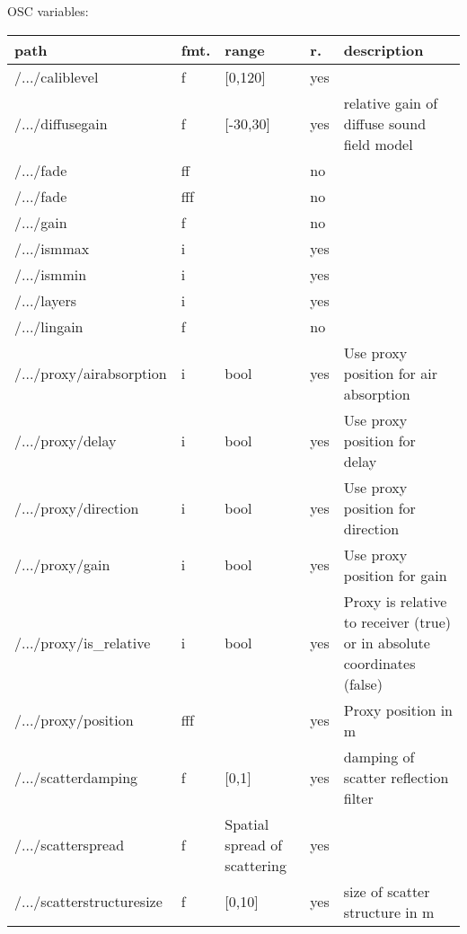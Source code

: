 \begin{snugshade}
{\footnotesize
\label{osctab:receivert}
OSC variables:
\nopagebreak

\begin{tabularx}{\textwidth}{llllX}
\hline
path & fmt. & range & r. & description\\
\hline
/.../caliblevel & f & [0,120] & yes & \\
/.../diffusegain & f & [-30,30] & yes & relative gain of diffuse sound field model\\
/.../fade & ff &  & no & \\
/.../fade & fff &  & no & \\
/.../gain & f &  & no & \\
/.../ismmax & i &  & yes & \\
/.../ismmin & i &  & yes & \\
/.../layers & i &  & yes & \\
/.../lingain & f &  & no & \\
/.../proxy/airabsorption & i & bool & yes & Use proxy position for air absorption\\
/.../proxy/delay & i & bool & yes & Use proxy position for delay\\
/.../proxy/direction & i & bool & yes & Use proxy position for direction\\
/.../proxy/gain & i & bool & yes & Use proxy position for gain\\
/.../proxy/is\_relative & i & bool & yes & Proxy is relative to receiver (true) or in absolute coordinates (false)\\
/.../proxy/position & fff &  & yes & Proxy position in m\\
/.../scatterdamping & f & [0,1] & yes & damping of scatter reflection filter\\
/.../scatterspread & f & Spatial spread of scattering & yes & \\
/.../scatterstructuresize & f & [0,10] & yes & size of scatter structure in m\\
\hline
\end{tabularx}
}
\end{snugshade}

